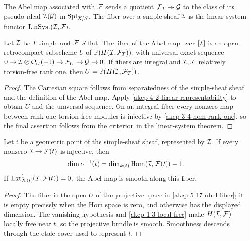 \begin{definition}
\label{akcp-5-16-abel-map}
The Abel map associated with $\mathcal F$ sends a quotient $\mathcal F_T\twoheadrightarrow\mathcal G$
to the class of its pseudo-ideal $\mathcal I(\mathcal G)$ in $\operatorname{Spl}_{X/S}$.  The fiber over a
 simple sheaf $\mathcal I$ is the linear-system functor
$\operatorname{LinSyst}(\mathcal I,\mathcal F)$.
\end{definition}

\begin{lemma}
\label{akcp-5-17-abel-fiber}
Let $\mathcal I$ be $T$-simple and $\mathcal F$ $S$-flat.  The fiber of the Abel map over
$[\mathcal I]$ is an open retrocompact subscheme $U$ of
$\mathbb P(H(\mathcal I,\mathcal F_T))$, with universal exact sequence
$0\to\mathcal I\otimes\mathcal O_U(-1)\to\mathcal F_U\to\mathcal G\to0$.
If fibers are integral and $\mathcal I,\mathcal F$ relatively torsion-free rank one, then
$U=\mathbb P(H(\mathcal I,\mathcal F_T))$.
\end{lemma}
\begin{proof}
The Cartesian square follows from separatedness of the simple-sheaf sheaf and
the definition of the Abel map.  Apply \cref{akcp-4-2-linear-representability}
to obtain $U$ and the universal sequence.  On an integral fiber every nonzero
map between rank-one torsion-free modules is injective by
\cref{akcp-3-4-hom-rank-one}, so the final assertion follows from the criterion
in the linear-system theorem.
\end{proof}

\begin{theorem}
\label{akcp-5-18-abel-smooth}
Let $t$ be a geometric point of the simple-sheaf sheaf, represented by $\mathcal I$.
If every nonzero $\mathcal I\to\mathcal F(t)$ is injective, then
\[
\dim \alpha^{-1}(t)=\dim_{k(t)}\operatorname{Hom}(\mathcal I,\mathcal F(t))-1.
\]
If $\operatorname{Ext}^1_{X(t)}(\mathcal I,\mathcal F(t))=0$, the Abel map is smooth along this fiber.
\end{theorem}
\begin{proof}
The fiber is the open $U$ of the projective space in
\cref{akcp-5-17-abel-fiber}; it is empty precisely when the Hom space is zero,
and otherwise has the displayed dimension.  The vanishing hypothesis and
\cref{akcp-1-3-local-free} make $H(\mathcal I,\mathcal F)$ locally free near $t$, so the
projective bundle is smooth.  Smoothness descends through the etale cover used
to represent $t$.
\end{proof}

